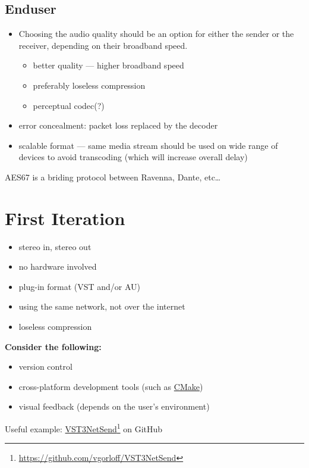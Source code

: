 \documentclass[a4paper,12pt]{article}
\begin{document}
{\subsection{Enduser}
\begin{itemize}
    \item Choosing the audio quality should be an option for either the sender or the receiver, depending on their broadband speed.
    \begin{itemize}
        \item better quality --- higher broadband speed
        \item preferably loseless compression
        \item perceptual codec(?)
    \end{itemize}
    \item error concealment: packet loss replaced by the decoder
    \item scalable format --- same media stream should be used on wide range of devices to avoid transcoding (which will increase overall delay)
\end{itemize}
AES67 is a briding protocol between Ravenna, Dante, etc\ldots

\section{First Iteration}
\begin{itemize}
    \item stereo in, stereo out
    \item no hardware involved
    \item plug-in format (VST and/or AU)
    \item using the same network, not over the internet
    \item loseless compression
\end{itemize}

\noindent
\textbf{Consider the following:}
\begin{itemize}
    \item version control
    \item cross-platform development tools (such as \href{https://cmake.org/}{CMake})
    \item visual feedback (depends on the user's environment)
\end{itemize}
Useful example: \href{https://github.com/vgorloff/VST3NetSend}{VST3NetSend}\footnote{\url{https://github.com/vgorloff/VST3NetSend}} on GitHub
}
\end{document}
